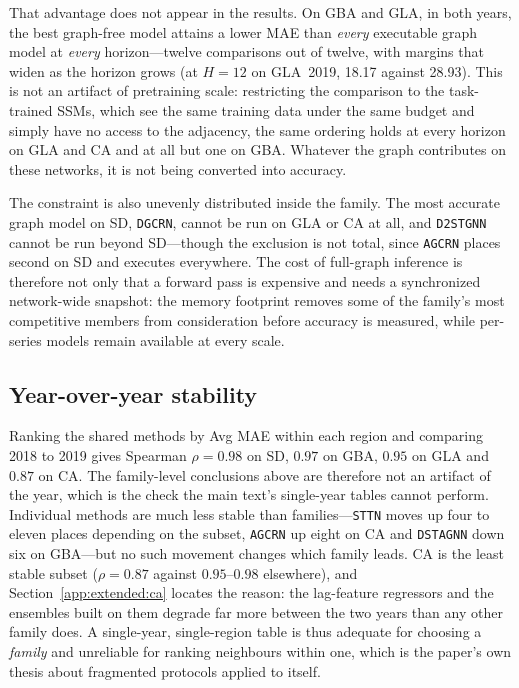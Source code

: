 That advantage does not appear in the results. On GBA and GLA, in both years,
the best graph-free model attains a lower MAE than \emph{every} executable graph
model at \emph{every} horizon---twelve comparisons out of twelve, with margins
that widen as the horizon grows (at $H{=}12$ on GLA~2019, 18.17 against 28.93).
This is not an artifact of pretraining scale: restricting the comparison to the
task-trained SSMs, which see the same training data under the same budget and
simply have no access to the adjacency, the same ordering holds at every horizon
on GLA and CA and at all but one on GBA. Whatever the graph contributes on these
networks, it is not being converted into accuracy.

The constraint is also unevenly distributed inside the family. The most accurate
graph model on SD, \texttt{DGCRN}, cannot be run on GLA or CA at all, and
\texttt{D2STGNN} cannot be run beyond SD---though the exclusion is not total,
since \texttt{AGCRN} places second on SD and executes everywhere. The cost of
full-graph inference is therefore not only that a forward pass is expensive and
needs a synchronized network-wide snapshot: the memory footprint removes some of
the family's most competitive members from consideration before accuracy is
measured, while per-series models remain available at every scale.

\subsection{Year-over-year stability}
\label{app:extended:years}

Ranking the shared methods by Avg MAE within each region and comparing 2018 to
2019 gives Spearman $\rho = 0.98$ on SD, $0.97$ on GBA, $0.95$ on GLA and
$0.87$ on CA. The family-level conclusions above are therefore not an artifact
of the year, which is the check the main text's single-year tables cannot
perform. Individual methods are much less stable than families---\texttt{STTN}
moves up four to eleven places depending on the subset, \texttt{AGCRN} up
eight on CA and \texttt{DSTAGNN} down six on GBA---but no such movement
changes which family leads. CA is the least stable subset
($\rho = 0.87$ against $0.95$--$0.98$ elsewhere), and
Section~\ref{app:extended:ca} locates the reason: the lag-feature regressors
and the ensembles built on them degrade far more between the two years than any
other family does. A single-year, single-region table is thus
adequate for choosing a \emph{family} and unreliable for ranking neighbours
within one, which is the paper's own thesis about fragmented protocols applied
to itself.

